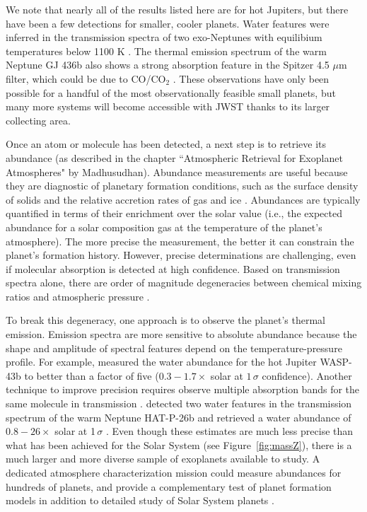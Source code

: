 \documentclass[graybox,natbib,nosecnum]{svmult}
\begin{document}
We note that nearly all of the results listed here are for hot Jupiters, but there have been a few detections for smaller, cooler planets. Water features were inferred in the transmission spectra of two exo-Neptunes with equilibium temperatures below 1100 K \citep{fraine14, wakeford17}. The thermal emission spectrum of the warm Neptune GJ 436b also shows a strong absorption feature in the Spitzer 4.5 $\mu$m filter, which could be due to CO/CO$_2$ \citep{morley17}.  These observations have only been possible for a handful of the most observationally feasible small planets, but many more systems will become accessible with JWST thanks to its larger collecting area. 

Once an atom or molecule has been detected, a next step is to retrieve its abundance (as described in the chapter ``Atmospheric Retrieval for Exoplanet Atmospheres" by Madhusudhan). Abundance measurements are useful because they are diagnostic of planetary formation conditions, such as the surface density of solids and the relative accretion rates of gas and ice \citep[e.g.][]{fortney13, mordasini16}. Abundances are typically quantified in terms of their enrichment over the solar value (i.e., the expected abundance for a solar composition gas at the temperature of the planet's atmosphere).  The more precise the measurement, the better it can constrain the planet's formation history. However, precise determinations are challenging, even if molecular absorption is detected at high confidence.  Based on transmission spectra alone, there are order of magnitude degeneracies between chemical mixing ratios and atmospheric pressure \citep{benneke12, griffith13}.  

To break this degeneracy, one approach is to observe the planet's thermal emission.  Emission spectra are more sensitive to absolute abundance because the shape and amplitude of spectral features depend on the temperature-pressure profile. For example, \cite{stevenson17} measured the water abundance for the hot Jupiter WASP-43b to better than a factor of five  ($0.3 - 1.7\times$ solar at $1\,\sigma$ confidence). Another technique to improve precision requires observe multiple absorption bands for the same molecule in transmission \citep{benneke12}.  \cite{wakeford17} detected two water features in the transmission spectrum of the warm Neptune HAT-P-26b and retrieved a water abundance of $0.8 - 26\times$ solar at 1\,$\sigma$ \citep{wakeford17}. Even though these estimates are much less precise than what has been achieved for the Solar System (see Figure \,\ref{fig:massZ}), there is a much larger and more diverse sample of exoplanets available to study.  A dedicated atmosphere characterization mission could measure abundances for hundreds of planets, and provide a complementary test of planet formation models in addition to detailed study of Solar System planets \citep{chapman17}. 
\end{document}
